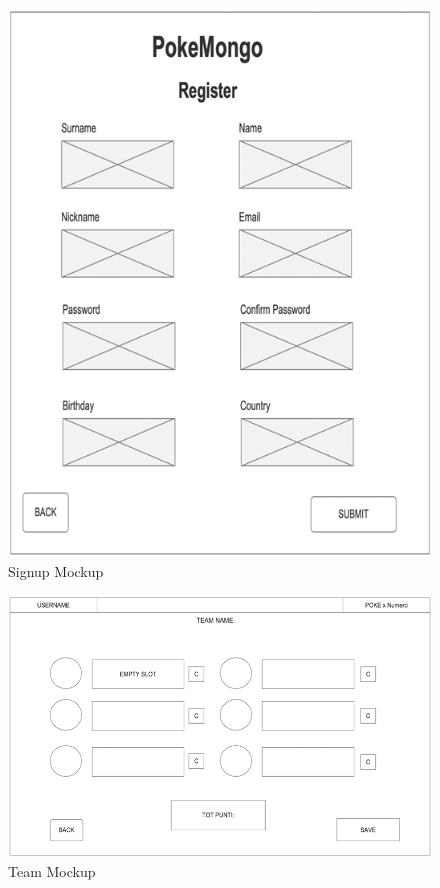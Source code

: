 \begin{figure}[h]
    \centering
    \includegraphics{img/Picture3.png}
    \caption{Signup Mockup}
\end{figure}


\begin{figure}[h]
    \centering
    \includegraphics[width=\textwidth]{img/Picture4.png}
    \caption{Team Mockup}
\end{figure}

